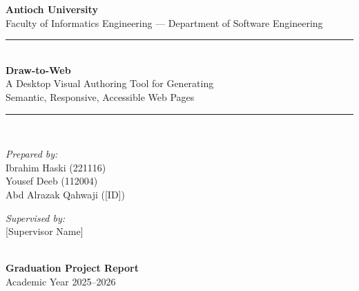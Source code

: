 \documentclass[12pt,a4paper,oneside]{report}
\begin{document}
\begin{titlepage}
  \centering
  {\Large \textbf{Antioch University}}\\[0.3cm]
  {\large Faculty of Informatics Engineering --- Department of Software Engineering}\\[2.5cm]

  \rule{\linewidth}{0.4mm}\\[0.6cm]
  {\huge \bfseries Draw-to-Web}\\[0.3cm]
  {\Large A Desktop Visual Authoring Tool for Generating\\[0.2cm]
   Semantic, Responsive, Accessible Web Pages}\\[0.4cm]
  \rule{\linewidth}{0.4mm}\\[1.5cm]

  \begin{minipage}{0.45\textwidth}
    \begin{flushleft}\large
      \textit{Prepared by:}\\
      Ibrahim Haski \quad (221116)\\
      Yousef Deeb \quad (112004)\\
      Abd Alrazak Qahwaji \quad ([ID])\\
    \end{flushleft}
  \end{minipage}
  \hfill
  \begin{minipage}{0.45\textwidth}
    \begin{flushright}\large
      \textit{Supervised by:}\\
      \textrm{[Supervisor Name]}\\
    \end{flushright}
  \end{minipage}\\[3cm]

  {\large \textbf{Graduation Project Report}}\\[0.3cm]
  {\large Academic Year 2025--2026}\\[0.5cm]
  \vfill
\end{titlepage}
\end{document}
